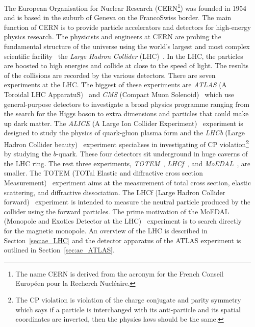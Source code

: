 The European Organisation for Nuclear Research (CERN\footnote{The name CERN is derived from the acronym for the French Conseil Europ\'{e}en pour la Recherch Nucl\'{e}aire.}) was founded in 1954 and is based in the suburb of Geneva on the Franco\textendash Swiss border.
The main function of CERN is to provide particle accelerators and detectors for high-energy physics research.
The physicists and engineers at CERN are probing the fundamental structure of the universe using the world's largest and most complex scientific facility \textemdash \ the \textit{Large Hadron Collider} (LHC)~\cite{1748-0221-3-08-S08001}.
In the LHC, the particles are boosted to high energies and collide at close to the speed of light.
The results of the collisions are recorded by the various detectors.
There are seven experiments at the LHC.
The biggest of these experiments are \textit{ATLAS} (A Toroidal LHC ApparatuS)~\cite{1748-0221-3-08-S08003} and \textit{CMS} (Compact Muon Solenoid)~\cite{1748-0221-3-08-S08004} which use general-purpose detectors to investigate a broad physics programme ranging from the search for the Higgs boson to extra dimensions and particles that could make up dark matter.
The \textit{ALICE} (A Large Ion Collider Experiment)~\cite{1748-0221-3-08-S08002} experiment is designed to study the physics of quark-gluon plasma form and the \textit{LHCb} (Large Hadron Collider beauty)~\cite{1748-0221-3-08-S08005} experiment specialises in investigating of CP violation\footnote{The CP violation is violation of the charge conjugate and parity symmetry which says if a particle is interchanged with its anti-particle and its spatial coordinates are inverted, then the physics laws should be the same.} by studying the $b$-quark.
These four detectors sit underground in huge caverns of the LHC ring.
The rest three experiments, \textit{TOTEM}~\cite{1748-0221-3-08-S08007}, \textit{LHCf}~\cite{1748-0221-3-08-S08006}, and \textit{MoEDAL}~\cite{Pinfold:1181486}, are smaller.
The TOTEM (TOTal Elastic and diffractive cross section Measurement)~\cite{1748-0221-3-08-S08007} experiment aims at the measurement of total cross section, elastic scattering, and diffractive dissociation.
The LHCf (Large Hadron Collider forward)~\cite{1748-0221-3-08-S08006} experiment is intended to measure the neutral particle produced by the collider using the forward particles.
The prime motivation of the MoEDAL (Monopole and Exotics Detector at the LHC)~\cite{Pinfold:1181486} experiment is to search directly for the magnetic monopole.
An overview of the LHC is described in Section~\ref{sec:ae_LHC} and the detector apparatus of the ATLAS experiment is outlined in Section~\ref{sec:ae_ATLAS}.

